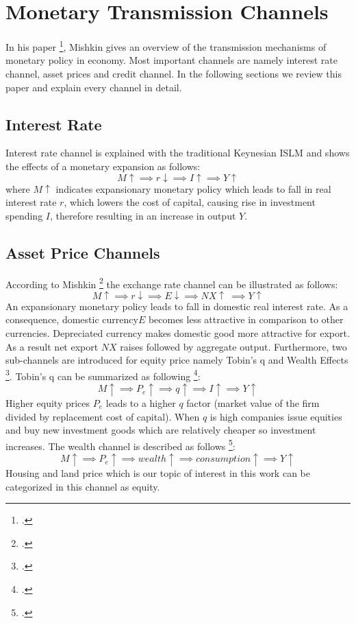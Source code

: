 \newpage
\section{Monetary Transmission Channels} \label{sec:MonetaryTransmissionChannels}
In his paper \footcite[See.][]{Mishkin1996}, Mishkin gives an overview of the transmission mechanisms of monetary policy in economy. Most important channels are namely interest rate channel, asset prices and credit channel. In the following sections we review this paper and explain every channel in detail. 

\subsection{Interest Rate}
Interest rate channel is explained with the traditional Keynesian \ac{ISLM} and shows the effects of a monetary expansion as follows:
  \[M \uparrow \implies r \downarrow \implies I \uparrow \implies Y \uparrow\]
where $ M \uparrow $ indicates expansionary monetary policy which leads to fall in real interest rate $r$, which lowers the cost of capital, causing rise in investment spending $I$, therefore resulting in an increase in output $Y$.

\subsection{Asset Price Channels}
According to Mishkin \footcite[See.][]{Mishkin1996} the exchange rate channel can be illustrated as follows:
 \[M \uparrow \implies r \downarrow \implies E \downarrow \implies NX \uparrow\ \implies Y \uparrow\]
An expansionary monetary policy leads to fall in domestic real interest rate. As a consequence, domestic currency$E$  becomes less attractive in comparison to other currencies. Depreciated currency makes domestic good more attractive for export. As a result net export $NX$ raises followed by aggregate output. 
Furthermore,  two sub-channels are introduced for equity price namely Tobin's q and Wealth Effects \footcite[See.][]{Mishkin1996}. 
Tobin's q can be summarized as following \footcite[See.][]{Mishkin1996}: 
 \[M \uparrow \implies P_e \uparrow \implies q \uparrow \implies I \uparrow \implies Y \uparrow\]
Higher equity prices $P_e$ leads to a higher $q$ factor (market value of the firm divided by replacement cost of capital). When $q$ is high companies issue equities and buy new investment goods which are relatively cheaper so investment increases. 
The wealth channel is described as follows \footcite[See.][]{Mishkin1996}: 
\[M \uparrow \implies P_e \uparrow \implies wealth \uparrow \implies consumption \uparrow \implies Y \uparrow\]
Housing and land price which is our topic of interest in this work can be categorized in this channel as equity.

